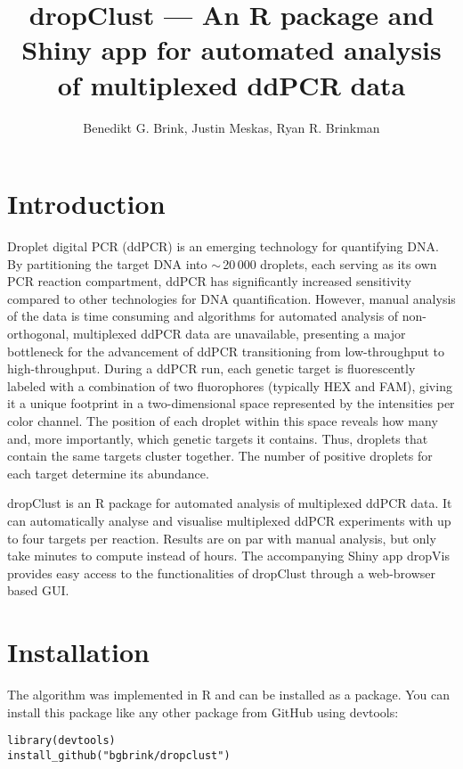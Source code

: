 \documentclass{article}
\title{dropClust --- An R package and Shiny app for automated analysis of multiplexed ddPCR data}
\author{Benedikt G. Brink, Justin Meskas, Ryan R. Brinkman}
\begin{document}


\maketitle

\tableofcontents

\section{Introduction}

Droplet digital PCR (ddPCR) is an emerging technology for quantifying DNA. By partitioning the target DNA into $\sim\,$20$\,$000 droplets, each serving as its own PCR reaction compartment, ddPCR has significantly increased sensitivity compared to other technologies for DNA quantification. However, manual analysis of the data is time consuming and algorithms for automated analysis of non-orthogonal, multiplexed ddPCR data are unavailable, presenting a major bottleneck for the advancement of ddPCR transitioning from low-throughput to high-throughput. During a ddPCR run, each genetic target is fluorescently labeled with a combination of two fluorophores (typically HEX and FAM), giving it a unique footprint in a two-dimensional space represented by the intensities per color channel. The position of each droplet within this space reveals how many and, more importantly, which genetic targets it contains. Thus, droplets that contain the same targets cluster together. The number of positive droplets for each target determine its abundance. 

dropClust is an R package for automated analysis of multiplexed ddPCR data. It can automatically analyse and visualise multiplexed ddPCR experiments with up to four targets per reaction. Results are on par with manual analysis, but only take minutes to compute instead of hours. The accompanying Shiny app dropVis provides easy access to the functionalities of dropClust through a web-browser based GUI.

\section{Installation}
The algorithm was implemented in R and can be installed as a package. You can install this package like any other package from GitHub using devtools:

\begin{verbatim}
library(devtools)
install_github("bgbrink/dropclust")
\end{verbatim}
\end{document}
